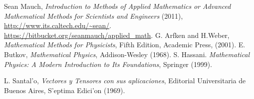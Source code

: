 \begin{thebibliography}{99}
 Sean Mauch, {\em Introduction to Methods of Applied Mathematics                           or Advanced Mathematical Methods for Scientists and Engineers} (2011), 
\url{http://www.its.caltech.edu/~sean/}. \url{https://bitbucket.org/seanmauch/applied_math}.
 G. Arfken and H.Weber, {\em Mathematical Methods for Physicists}, Fifth Edition, Academic Press, (2001).
 E. Butkov, {\em Mathematical Physics}, Addison-Wesley (1968).
 S. Hassani. {\em Mathematical Physics: A Modern Introduction to Its Foundations}, Springer (1999).
\item L. Santal'o, {\em Vectores y Tensores con sus aplicaciones}, Editorial Universitaria de Buenos Aires, S'eptima Edici'on (1969).
\end{thebibliography}
